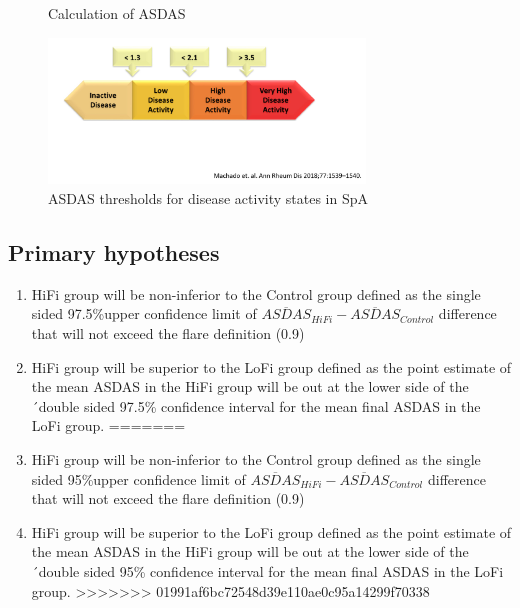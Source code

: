 \documentclass{article}\usepackage[]{graphicx}\usepackage[]{color}
\begin{document}
\begin{figure}
  \centering
  \caption {Calculation of ASDAS}
  \label{fig:asdas}
\end{figure}

\begin{figure}
  \centering
  \includegraphics[width=0.75\textwidth]{asdasactivity.png}
  \caption{ASDAS thresholds for disease activity states in SpA}
  \label{fig:asdasactivity}
\end{figure}

\subsection{Primary hypotheses}

\begin{enumerate}
<<<<<<< HEAD
\item HiFi group will be non-inferior to the Control group defined as the single sided 97.5\%upper confidence limit of  $\overline{ASDAS}_{HiFi} - \overline{ASDAS}_{Control}$ difference that will not exceed the flare definition (0.9)
\item HiFi group will be superior to the LoFi group defined as the point estimate of the mean ASDAS in the HiFi group will be out at the lower side of the ´double sided 97.5\% confidence interval for the mean final ASDAS in the LoFi group.
=======
\item HiFi group will be non-inferior to the Control group defined as the single sided 95\%upper confidence limit of  $\overline{ASDAS}_{HiFi} - \overline{ASDAS}_{Control}$ difference that will not exceed the flare definition (0.9)
\item HiFi group will be superior to the LoFi group defined as the point estimate of the mean ASDAS in the HiFi group will be out at the lower side of the ´double sided 95\% confidence interval for the mean final ASDAS in the LoFi group.
>>>>>>> 01991af6bc72548d39e110ae0c95a14299f70338
\end{enumerate}
\end{document}
